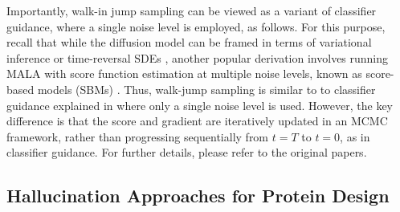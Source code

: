 Importantly, walk-in jump sampling can be viewed as a variant of classifier guidance, where a single noise level is employed, as follows. For this purpose, recall that while the diffusion model can be framed in terms of variational inference \citep{ho2020denoising} or time-reversal SDEs \citep{song2021score}, another popular derivation involves running MALA with score function estimation at multiple noise levels, known as score-based models (SBMs) \citep{song2019generative}. Thus, walk-jump sampling is similar to to classifier guidance explained in  where only a single noise level is used.  However, the key difference is that the score and gradient are iteratively updated in an MCMC framework, rather than progressing sequentially from $t = T$ to $t = 0$, as in classifier guidance. For further details, please refer to the original papers.


\subsection{Hallucination Approaches for Protein Design} 

